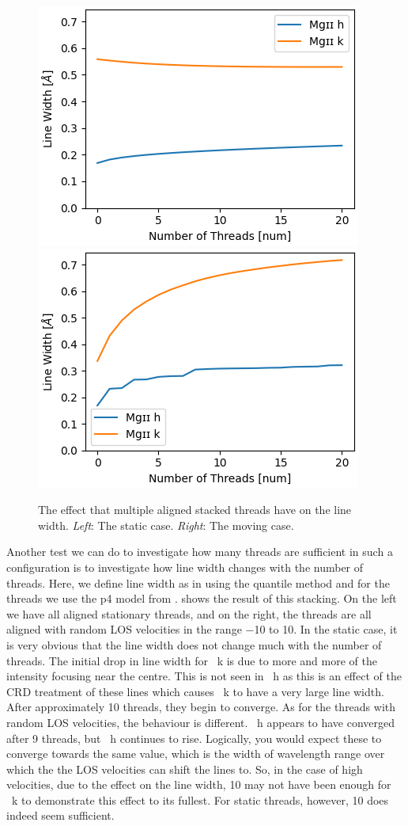 \begin{figure}
    \includegraphics[width=0.49\linewidth]{./03Modelling2D/figs/stak.png}
    \includegraphics[width=0.49\linewidth]{./03Modelling2D/figs/stac.png}
    \caption[The effect that multiple aligned stacked threads have on the line width.]{The effect that multiple aligned stacked threads have on the line width. \textit{Left}: The static case. \textit{Right}: The moving case.}
    \label{lwzoom}
\end{figure}

Another test we can do to investigate how many threads are sufficient in such a configuration is to investigate how line width changes with the number of threads. Here, we define line width as in  using the quantile method and for the threads we use the p4 model from \cite{labrosse_radiative_2016}.  shows the result of this stacking. On the left we have all aligned stationary threads, and on the right, the threads are all aligned with random LOS velocities in the range $-$10\kms{} to 10\kms. In the static case, it is very obvious that the line width does not change much with the number of threads. The initial drop in line width for \mgii~k is due to more and more of the intensity focusing near the centre. This is not seen in \mgii~h as this is an effect of the CRD treatment of these lines which causes \mgii~k to have a very large line width. After approximately 10 threads, they begin to converge. As for the threads with random LOS velocities, the behaviour is different. \mgii~h appears to have converged after 9 threads, but \mgii~h continues to rise. Logically, you would expect these to converge towards the same value, which is the width of wavelength range over which the the LOS velocities can shift the lines to. So, in the case of high velocities, due to the effect on the line width, 10 may not have been enough for \mgii~k to demonstrate this effect to its fullest. For static threads, however, 10 does indeed seem sufficient.

